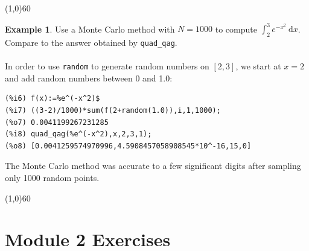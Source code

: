 \documentclass[10.5pt,twoside]{report}
\theoremstyle{definition}
\newtheorem{exmp}{Example}[section]
\begin{document}
\line(1,0){60}
\linethickness{0.5mm}

\begin{exmp} Use a Monte Carlo method with $N=1000$ to compute $\displaystyle \int_2^3 e^{-x^2}\ \mathrm{d}x$.  Compare to the answer obtained by \verb|quad_qag|.\\
${}$\\
In order to use \verb|random| to generate random numbers on $[2,3]$, we start at $x=2$ and add random numbers between 0 and 1.0:

\begin{verbatim}
(%i6) f(x):=%e^(-x^2)$
(%i7) ((3-2)/1000)*sum(f(2+random(1.0)),i,1,1000);
(%o7) 0.0041199267231285
(%i8) quad_qag(%e^(-x^2),x,2,3,1);
(%o8) [0.0041259574970996,4.5908457058908545*10^-16,15,0]
\end{verbatim}

The Monte Carlo method was accurate to a few significant digits after sampling only 1000 random points.


\end{exmp}
\line(1,0){60}
\linethickness{0.5mm}
\pagebreak


\section{Module 2 Exercises}\label{Module 2 Exercises}
\end{document}
